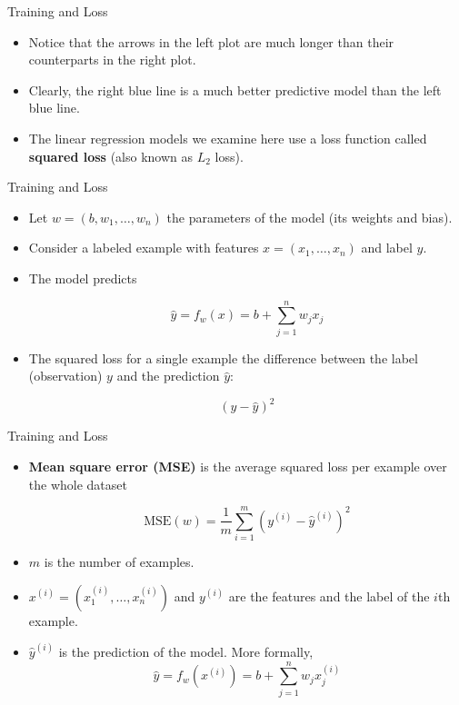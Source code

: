 \documentclass{beamer}
\begin{document}

\begin{frame}{Training and Loss}
\begin{itemize}
\item Notice that the arrows in the left plot are much longer than their counterparts in the right plot. 

\medskip    
\item Clearly, the right blue line is a much better predictive model than the left blue line.

\medskip
\item The linear regression models we examine here use a loss function called {\bf squared loss} (also known as $L_2$ loss). 
\end{itemize}
\end{frame}


\begin{frame}{Training and Loss}
\begin{itemize}
\item Let $w=(b,w_1,\ldots,w_n)$ the parameters of the model (its weights and bias).

\item Consider a labeled example with features $x=(x_1,\ldots,x_n)$ and label $y$.

\item The model predicts

$$ \hat{y} = f_w(x) = b + \sum_{j=1}^n w_j x_j$$

\item The squared loss for a single example the difference between the label (observation) $y$ and the prediction $\hat{y}$:

$$ (y - \hat{y})^2 $$    
\end{itemize}
\end{frame}


\begin{frame}{Training and Loss}
\begin{itemize}
\item {\bf Mean square error (MSE)} is the average squared loss per example over the whole dataset
    
$$ \mathrm{MSE}(w) = \frac{1}{m} \sum_{i=1}^m (y^{(i)} - \hat{y}^{(i)})^2 $$

\medskip
\item $m$ is the number of examples.

\medskip
\item $x^{(i)}=(x^{(i)}_1,\ldots,x^{(i)}_n)$ and $y^{(i)}$ are the features and the label of the $i$th example.

\medskip
\item $\hat{y}^{(i)}$ is the prediction of the model. More formally, 
$$ \hat{y} = f_w(x^{(i)}) = b + \sum_{j=1}^n w_j x^{(i)}_j $$
\end{itemize}
\end{frame}
\end{document}
